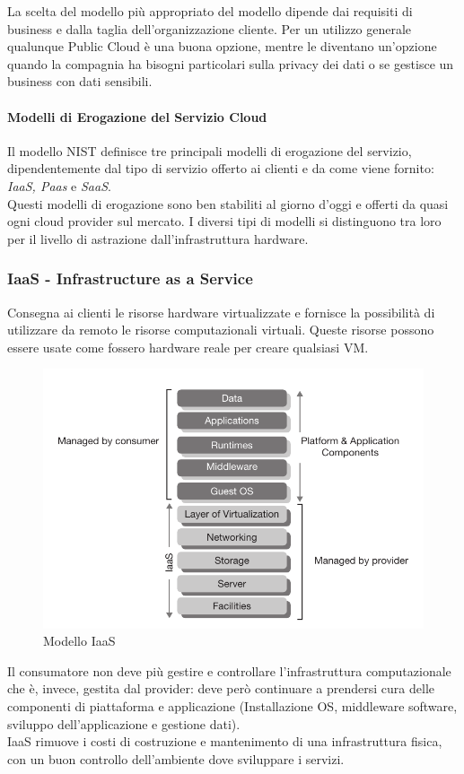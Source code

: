 \documentclass{article}
\begin{document}
La scelta del modello più appropriato del modello dipende dai requisiti di business e dalla taglia dell’organizzazione cliente. Per un utilizzo generale qualunque Public Cloud è una buona opzione, mentre le diventano un’opzione quando la compagnia ha bisogni particolari sulla privacy dei dati o se gestisce un business con dati sensibili.

\paragraph{Modelli di Erogazione del Servizio Cloud}
Il modello NIST definisce tre principali modelli di erogazione del servizio, dipendentemente dal tipo di servizio offerto ai clienti e da come viene fornito: \textit{IaaS, Paas} e \textit{SaaS}.\\
Questi modelli di erogazione sono ben stabiliti al giorno d’oggi e offerti da quasi ogni cloud provider sul mercato. I diversi tipi di modelli si distinguono tra loro per il livello di astrazione dall’infrastruttura hardware.

\subsubsection{IaaS - Infrastructure as a Service}
Consegna ai clienti le risorse hardware virtualizzate e fornisce la possibilità di utilizzare da remoto le risorse computazionali virtuali. Queste risorse possono essere usate come fossero hardware reale per creare qualsiasi VM.

\begin{figure}[H]
    \centering
    \includegraphics[scale=0.5]{img/iaas.png}
    \caption{Modello IaaS}
\end{figure}
\noindent
Il consumatore non deve più gestire e controllare l’infrastruttura computazionale che è, invece, gestita dal provider: deve però continuare a prendersi cura delle componenti di piattaforma e applicazione (Installazione OS, middleware software, sviluppo dell’applicazione e gestione dati).\\
IaaS rimuove i costi di costruzione e mantenimento di una infrastruttura fisica, con un buon controllo dell’ambiente dove sviluppare i servizi.
\end{document}
